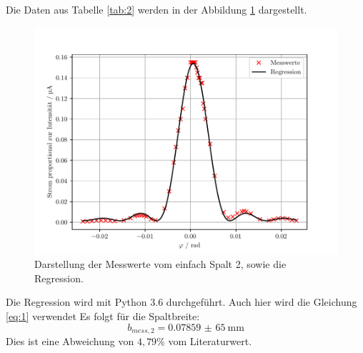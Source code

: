 Die Daten aus Tabelle \ref{tab:2} werden in der Abbildung
\ref{abb:5} dargestellt.

\begin{figure}[H]
  \centering
  \includegraphics{plot2.pdf}
  \caption{Darstellung der Messwerte vom einfach Spalt 2, sowie die Regression.}
  \label{abb:5}
\end{figure}

Die Regression wird mit Python 3.6 durchgeführt. Auch hier wird die Gleichung \ref{eq:1} verwendet
Es folgt für die Spaltbreite:
\begin{equation*}
  b_{mess,2} = \SI{0,07859(65)}{\milli\metre}
\end{equation*}
Dies ist eine Abweichung von $4,79\%$ vom Literaturwert.

